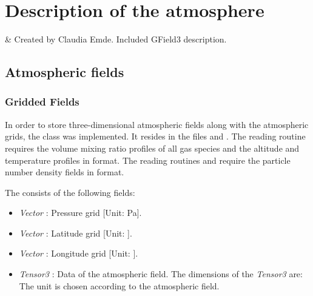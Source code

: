 \chapter{Description of the atmosphere}
 \label{sec:atmosphere}

 & Created by Claudia Emde. Included GField3 description.\\ 
\stophistory


\section{Atmospheric fields} 
\label{sec:atmosphere:atmospheric_fields}

\subsection{Gridded Fields} 

In order to store three-dimensional atmospheric fields along with the
atmospheric grids, the class  was
implemented. It resides in the files  and
.  The reading routine
 requires the volume mixing ratio profiles of all
gas species and the altitude and temperature profiles in
 format. The reading routines
 and  require
the particle number density fields in  format.

The  consists of the following fields:
\begin{itemize}
\item {\sl Vector} : Pressure grid [Unit: Pa].
\item {\sl Vector} : Latitude grid [Unit:
  \degree].
\item {\sl Vector} : Longitude grid [Unit:
  \degree].
\item {\sl Tensor3} : Data of the atmospheric
  field. The dimensions of the {\sl Tensor3} are:
  \\
  The unit is chosen according to the atmospheric field. 
\end{itemize} 




